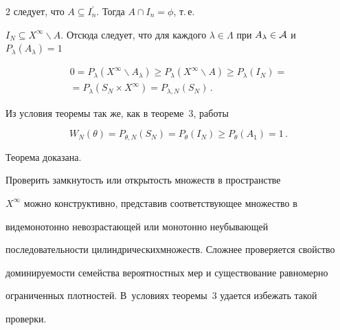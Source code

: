 \begin{multicols}{2}
следует, что $A\subseteq I_n^\prime$. Тогда $A\cap I_n=\phi$, т.\,е.\ 


$I_N\subseteq X^\infty \backslash A$. Отсюда следует, что для каждого $\lambda 


\in \Lambda$ при $A_\lambda \in \cal{A}$  и $P_\lambda (A_\lambda )=1$


    \begin{multline*}


    0 = P_\lambda \left ( X^\infty \backslash  A_\lambda \right ) \geq


    P_\lambda \left ( X^\infty\backslash A\right ) \geq P_\lambda \left (I_N\right ) ={}\\


    {}=


    P_\lambda \left ( S_N\times X^\infty\right ) = P_{\lambda,N}(S_N)\,.


    \end{multline*}





    Из условия теоремы так же, как в теореме~3, работы~\cite{1gr}


    $$


    W_N(\theta ) = P_{\theta, N}(S_N) = P_\theta (I_N)\geq P_\theta \left ( A_1\right ) 


=1\,.


    $$


    


    Теорема доказана.


    \medskip


    


    Проверить замкнутость или открытость множеств в пространстве 


$X^\infty$ можно конструктивно, представив соответствующее множество в 


виде\linebreak монотонно невозрастающей или монотонно неубывающей 


последовательности цилиндрических\linebreak множеств. Сложнее проверяется свойство 


доминируемости семейства вероятностных мер и существование равномерно 


ограниченных плотностей. В~условиях теоремы~3 удается избежать такой 


проверки. 



\end{multicols}
